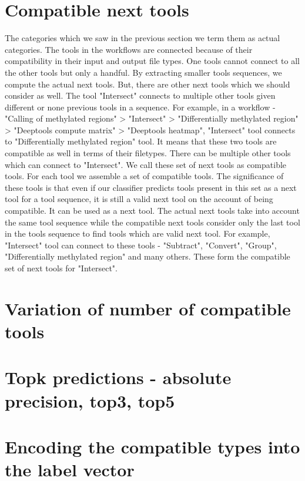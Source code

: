 \section{Compatible next tools}
The categories which we saw in the previous section we term them as actual categories. The tools in the workflows are connected because of their compatibility in their input and output file types. One tools cannot connect to all the other tools but only a handful. By extracting smaller tools sequences, we compute the actual next tools. But, there are other next tools which we should consider as well. The tool "Intersect" connects to multiple other tools given different or none previous tools in a sequence. For example, in a workflow - "Calling of methylated regions" > "Intersect" > "Differentially methylated region" > "Deeptools compute matrix" > "Deeptools heatmap", "Intersect" tool connects to "Differentially methylated region" tool. It means that these two tools are compatible as well in terms of their filetypes. There can be multiple other tools which can connect to "Intersect". We call these set of next tools as compatible tools. For each tool we assemble a set of compatible tools. The significance of these tools is that even if our classifier predicts tools present in this set as a next tool for a tool sequence, it is still a valid next tool on the account of being compatible. It can be used as a next tool. The actual next tools take into account the same tool sequence while the compatible next tools consider only the last tool in the tools sequence to find tools which are valid next tool. For example, "Intersect" tool can connect to these tools - "Subtract", "Convert", "Group", "Differentially methylated region" and many others. These form the compatible set of next tools for "Intersect".

\section{Variation of number of compatible tools}

\section{Topk predictions - absolute precision, top3, top5}

\section{Encoding the compatible types into the label vector}

